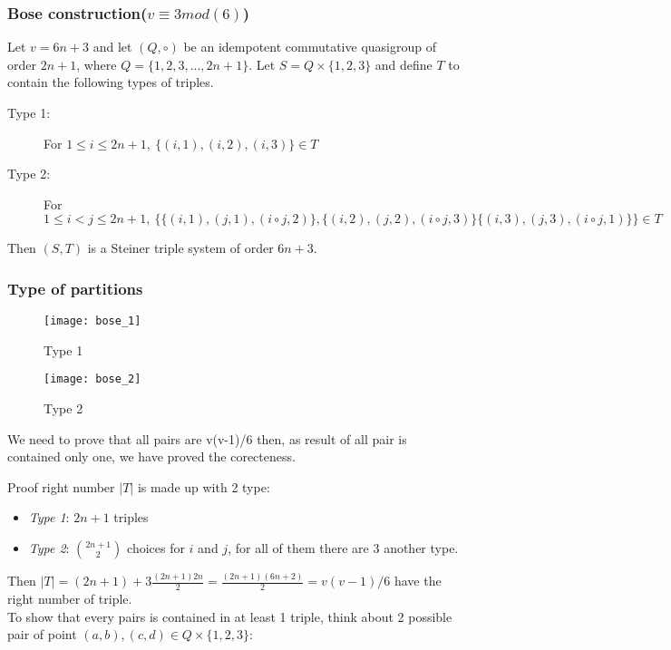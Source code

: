 \begin{frame}
\frametitle{Bose construction($v \equiv 3 mod(6)$)} 
Let $v = 6n +3$ and let $(Q,\circ)$ be an idempotent commutative quasigroup of order $2n+1$, where $Q = \{1,2,3,...,2n+1\}$. Let $S= Q \times \{1,2,3\}$ and define $T$ to contain the following types of triples.
\begin{description}
	\item[Type 1:] For $1 \le i \le 2n +1, \ \{(i,1),(i,2),(i,3)\} \in T$ 
	\item[Type 2:] For $1 \le i < j \le 2n +1, \ \{ \{ (i,1),(j,1),(i \circ j,2)\},\{ (i,2),(j,2),(i \circ j,3)\}\{ (i,3),(j,3),(i \circ j,1)\}\} \in T$
\end{description}

Then $(S,T)$ is a Steiner triple system of order $6n + 3$.

\end{frame}

\begin{frame}
\frametitle{Type of partitions}
\begin{figure}
	\texttt{[image: bose\_1]}
	\caption{Type 1}
\end{figure}
\begin{figure}
	\texttt{[image: bose\_2]}
	\caption{Type 2}
\end{figure}
\end{frame}


\begin{comment}
If we are considering a set of v(v-1)/6 triples of 
elements of a v-set and know that each pair elements is 
contained in at least one triple, then each pair must be 
contained in exactly one triple and we have an STS(v). 
Therefore we need only count the number of triples and verify 
that each pair of elements is contained in a triple in order to 
show that a system is an STS.
\end{comment}
\begin{frame}
We need to prove that all pairs are v(v-1)/6 then, as result of all pair is contained only one, we have proved the corecteness.

\begin{block}{Proof right number}
$|T|$ is made up with 2 type:\begin{itemize}
	\item \textit{Type 1}: $2n+1$ triples
	\item \textit{Type 2}: $\binom{2n + 1}{2}$ choices for $i$ and $j$, for all of them there are 3 another type.
\end{itemize} 
Then $|T| = (2n+1) + 3\frac{(2n+1)2n}{2} = \frac{(2n+1)(6n+2)}{2} = v(v-1)/6$ have the right number of triple.\\%

To show that every pairs is contained in at least 1 triple, think about 2 possible pair of point $(a,b),(c,d) \in Q \times \{1,2,3\}$:

\end{block}\end{frame}

